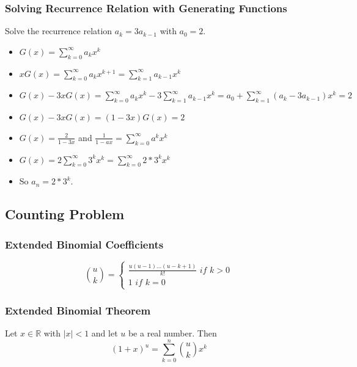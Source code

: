 \documentclass{article}
\begin{document}
\subsubsection{Solving Recurrence Relation with Generating Functions} Solve the recurrence relation $ a_k = 3a_{k-1} $ with $ a_0 = 2 $.
\begin{tcolorbox}
\begin{itemize}
\item $ G(x) = \sum_{k=0}^{\infty} a_kx^k $
\item $ xG(x) = \sum_{k=0}^{\infty} a_kx^{k+1} = \sum_{k=1}^{\infty} a_{k-1}x^k $
\item $ G(x) - 3xG(x) = \sum_{k=0}^{\infty} a_kx^k - 3\sum_{k=1}^{\infty} a_{k-1}x^k = a_0 + \sum_{k=1}^{\infty} (a_{k} - 3a_{k-1})x^k = 2 $
\item $ G(x) - 3xG(x) = (1-3x)G(x) = 2 $
\item $ G(x) = \frac{2}{1- 3x} $ and $ \frac{1}{1 - ax} = \sum_{k=0}^{\infty} a^kx^k $
\item $ G(x) = 2 \sum_{k=0}^{\infty} 3^kx^k = \sum_{k=0}^{\infty} 2*3^kx^k  $
\item So $ a_n = 2*3^k $.
\end{itemize}
\end{tcolorbox}

\subsection{Counting Problem}
\subsubsection{Extended Binomial Coefficients}
\begin{equation}
\binom{u}{k} = \left\{
    \begin{array}{ll}
        \frac{u(u-1)...(u-k+1)}{k!} \textit{ if } k > 0\\
        1 \textit{ if } k = 0
    \end{array}
\right.
\end{equation}

\subsubsection{Extended Binomial Theorem} Let $ x \in \mathbb{R} $ with $ |x| < 1 $ and let $ u $ be a real number. Then
\begin{equation}
(1 + x)^u = \sum_{k=0}^n \binom{u}{k}x^k
\end{equation}
\end{document}
